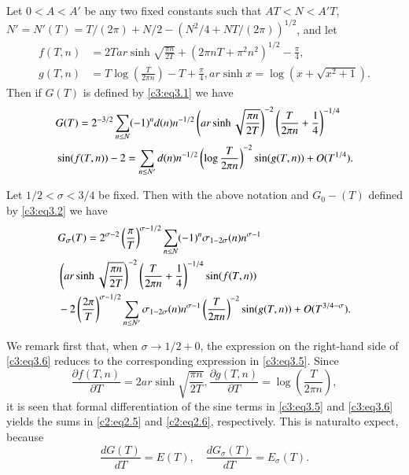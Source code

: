 \begin{thm}\label{c3:thm3.1}
  Let $0 < A < A'$ be any two fixed constants such that $AT < N <
  A'T$, $N' = N'(T)= T/(2 \pi) + N/2 - (N^2 /4 + NT/(2 \pi))^{1/2}$,
  and let 
  \begin{align*}
    f(T, n) & = 2 T ar \sinh \sqrt{\frac{\pi n}{2T}}+ \left(2 \pi n T +
    \pi^2 n^2\right)^{1/2} - \frac{\pi}{4},\\
    g(T, n) & = T \log \left( \frac{T}{2 \pi n}\right) - T +
    \frac{\pi}{4}, ar \sinh x = \log \left(x + \sqrt{x^2 +1} \right).
  \end{align*}
  Then if $G(T)$ is defined by \eqref{c3:eq3.1} we have
  \begin{align}
   & G(T)  = 2^{-3/2} \sum_{n \leq N} (-1)^n d(n) n^{-1/2} \left(ar
    \sinh \sqrt{\frac{\pi n}{2T}} \right)^{-2} \left(\frac{T}{2 \pi n}
    + \frac{1}{4}\right)^{-1/4}\label{c3:eq3.5}\\ 
   & \sin (f(T, n))
    - 2 =\sum_{n \leq N'} d(n) n^{-1/2} \left(\log \frac{T}{2 \pi n}
    \right)^{-2} \sin (g(T, n)) + O(T^{1/4}).\notag
  \end{align}
\end{thm}

\begin{thm}\label{c3:thm3.2}
  Let $1/2 < \sigma < 3/4$ be fixed. Then with the above notation and
  $G_0- (T)$ defined by \eqref{c3:eq3.2} we have
  \begin{align}
    & G_\sigma (T)  = 2^{\sigma-2} \left(\frac{\pi}{T}\right)^{\sigma -
      1/2} \sum_{n \leq N} (-1)^{n}\sigma_{1- 2 \sigma} (n)
    n^{\sigma-1}\label{c3:eq3.6}\\ 
    & \left(ar \sinh \sqrt{\frac{\pi n}{2T}}\right)^{-2}
    \left(\frac{T}{2 \pi n} + \frac{1}{4} \right)^{-1/4} \sin (f(T,
    n))\notag\\
    & - 2 \left(\frac{2 \pi}{T}\right)^{\sigma - 1/2} \sum_{n \leq N'}
    \sigma_{1-2 \sigma} (n) n^{\sigma-1} \left(\frac{T}{2 \pi n}
    \right)^{-2} \sin (g(T, n) ) + O (T^{3/4- \sigma}).\notag
  \end{align}
\end{thm}

We remark first that, when $\sigma \to 1/2 + 0$, the expression on the
right-hand side of \eqref{c3:eq3.6} reduces to the corresponding
expression in \eqref{c3:eq3.5}. Since
$$
\frac{\partial f (T, n)}{\partial T} = 2 ar \sinh \sqrt{\frac{\pi
    n}{2T}}, \frac{\partial g(T, n)}{\partial T} = \log
\left(\frac{T}{2 \pi n} \right),
$$
it is seen that formal differentiation of the sine terms in
\eqref{c3:eq3.5} and \eqref{c3:eq3.6} yields the sums in
\eqref{c2:eq2.5} and \eqref{c2:eq2.6}, respectively. This is
natural\pageoriginale to expect, because
$$
\frac{d G(T)}{dT} = E(T) , \quad \frac{dG_\sigma (T)}{dT} = E_\sigma (T).
$$

